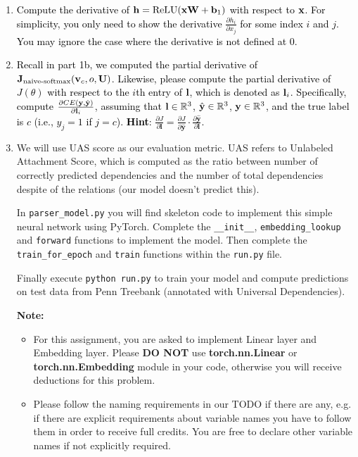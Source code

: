 \begin{parts}
\begin{enumerate}[label=\roman*.]
        \item \textcolor{black}{Compute the derivative of $\mathbf{h} = \operatorname{ReLU}(\mathbf{x} \mathbf{W} + \mathbf{b}_1)$ with respect to $\mathbf{x}$. For simplicity, you only need to show the derivative $\frac{\partial h_i}{\partial x_j}$ for some index $i$ and $j$. You may ignore the case where the derivative is not defined at 0.}
        \item \textcolor{black}{Recall in part 1b, we computed the partial derivative of $\mathbf{J}_{\text{naive-softmax}}(\mathbf{v}_c, o, \mathbf{U})$. Likewise, please compute the partial derivative of $J(\theta)$ with respect to the $i$th entry of $\mathbf{l}$, which is denoted as $\mathbf{l}_i$. Specifically, compute $\frac{\partial CE(\mathbf{y}, \hat{\mathbf{y}})}{\partial \mathbf{l}_i}$, assuming that $\mathbf{l} \in \mathbb{R}^3$, $\hat{\mathbf{y}} \in \mathbb{R}^3$, $\mathbf{y} \in \mathbb{R}^3$, and the true label is $c$ (i.e., $y_j=1$ if $j=c$).
        \textbf{Hint}:  $\frac{\partial J}{\partial \mathbf{l}} = \frac{\partial J}{\partial \hat{\mathbf{y}}} \cdot \frac{\partial \hat{\mathbf{y}}}{\partial \mathbf{l}}$.}
        \item We will use UAS score as our evaluation metric. UAS refers to Unlabeled Attachment Score, which is computed as the ratio between number of correctly predicted dependencies and the number of total dependencies despite of the relations (our model doesn't predict this).\newline
    
   In \texttt{parser\_model.py} you will find skeleton code to implement this simple neural network using PyTorch. Complete the \texttt{\_\_init\_\_}, \texttt{embedding\_lookup} and \texttt{forward} functions to implement the model. Then complete the \texttt{train\_for\_epoch} and \texttt{train} functions within the \texttt{run.py} file.
   
    Finally execute \texttt{python run.py} to train your model and compute predictions
    on test data from Penn Treebank (annotated with Universal Dependencies). 
    
    \textbf{Note:}
    \begin{itemize}
        \item For this assignment, you are asked to implement Linear layer and Embedding layer. Please \textbf{DO NOT} use \textbf{torch.nn.Linear} or  \textbf{torch.nn.Embedding} module in your code, otherwise you will receive deductions for this problem. 
        \item Please follow the naming requirements in our TODO if there are any, e.g. if there are explicit requirements about variable names you have to follow them in order to receive full credits. You are free to declare other variable names if not explicitly required. 
    \end{itemize}
    

\end{enumerate}
\end{parts}
